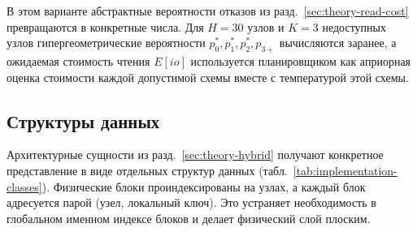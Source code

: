 \begin{center}

\end{center}

В этом варианте абстрактные вероятности отказов из разд.~\ref{sec:theory-read-cost}
превращаются в конкретные числа. Для \(H = 30\) узлов и \(K = 3\)
недоступных узлов гипергеометрические вероятности
\(p_0^*, p_1^*, p_2^*, p_{3+}\) вычисляются заранее, а ожидаемая стоимость
чтения \(E[io]\) используется планировщиком как априорная оценка стоимости
каждой допустимой схемы вместе с температурой этой схемы.

\subsection{Структуры данных}

Архитектурные сущности из разд.~\ref{sec:theory-hybrid} получают конкретное
представление в виде отдельных структур данных
(табл.~\ref{tab:implementation-classes}). Физические блоки проиндексированы
на узлах, а каждый блок адресуется парой (узел, локальный ключ). Это устраняет
необходимость в глобальном именном индексе блоков и делает физический слой
плоским.

